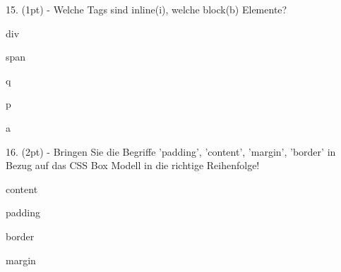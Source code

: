 \documentclass[10pt,ngerman]{examdesign}
\begin{document}
\begin{truefalse}
  15. (1pt) - Welche Tags sind inline(i), welche block(b) Elemente?
  \begin{question}
     div
  \end{question}
  \begin{question}
     span
  \end{question}
  \begin{question}
     q
  \end{question}
  \begin{question}
     p
  \end{question}
  \begin{question}
     a
  \end{question}
\end{truefalse}



\begin{truefalse}
  16. (2pt) - Bringen Sie die Begriffe 'padding', 'content', 'margin', 'border'  in Bezug
  auf das CSS Box Modell in die richtige Reihenfolge!
  \begin{question}
     content
  \end{question}
  \begin{question}
     padding
  \end{question}
  \begin{question}
     border
  \end{question}
  \begin{question}
     margin
  \end{question}
\end{truefalse}
\end{document}
